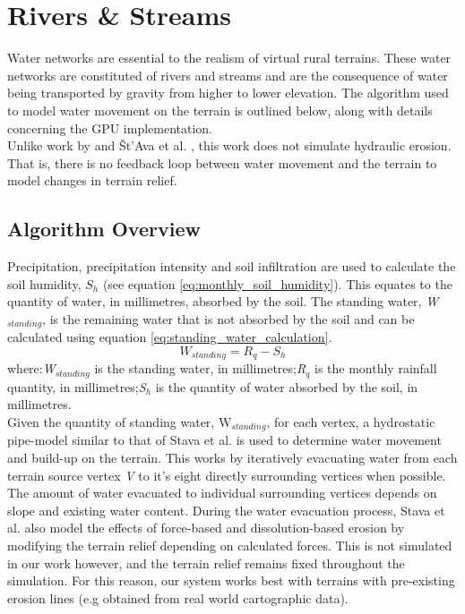 \section{Rivers \& Streams} \label{sec:rivers_and_streams}

Water networks are essential to the realism of virtual rural terrains. These water networks are constituted of rivers and streams and are the consequence of water being transported by gravity from higher to lower elevation. The algorithm used to model water movement on the terrain is outlined below, along with details concerning the GPU implementation.\\
Unlike work by \cite{Kelley1988} and Št'Ava et al. \cite{StAva2008}, this work does not simulate hydraulic erosion. That is, there is no feedback loop between water movement and the terrain to model changes in terrain relief.

\subsection{Algorithm Overview}

Precipitation, precipitation intensity and soil infiltration are used to calculate the soil humidity, $S_{h}$ (see equation \ref{eq:monthly_soil_humidity}). This equates to the quantity of water, in millimetres, absorbed by the soil. The standing water, \textit{W$_{standing}$}, is the remaining water that is not absorbed by the soil and can be calculated using equation \ref{eq:standing_water_calculation}. \\

\begin{equation} \label{eq:standing_water_calculation}
	W_{standing} = R_{q} - S_{h}
\end{equation}
where:\textit{W$_{standing}$} is the standing water, in millimetres;\textit{R$_{q}$} is the monthly rainfall quantity, in millimetres;\textit{S$_{h}$} is the quantity of water absorbed by the soil, in millimetres.\\

Given the quantity of standing water, W$_{standing}$, for each vertex, a hydrostatic pipe-model similar to that of Stava et al. \cite{StAva2008} is used to determine water movement and build-up on the terrain. This works by iteratively evacuating water from each terrain source vertex \textit{V} to it's eight directly surrounding vertices when possible. The amount of water evacuated to individual surrounding vertices depends on slope and existing water content. During the water evacuation process, Stava et al. \cite{StAva2008} also model the effects of force-based and dissolution-based erosion by modifying the terrain relief depending on calculated forces. This is not simulated in our work however, and the terrain relief remains fixed throughout the simulation. For this reason, our system works best with terrains with pre-existing erosion lines (e.g obtained from real world cartographic data). \\

